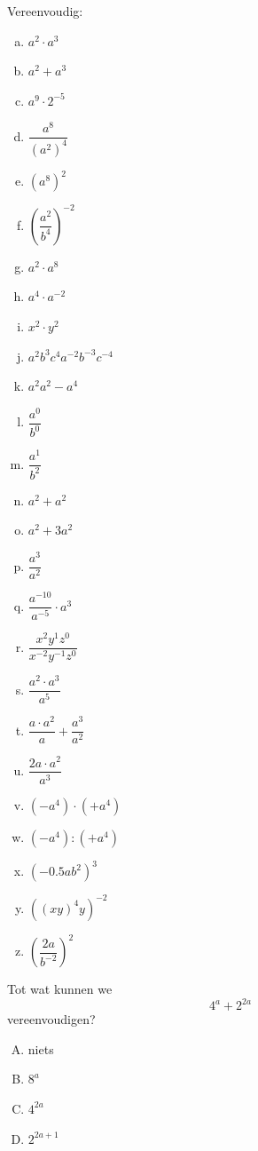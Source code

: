 \documentclass[12pt,twoside,a4paper]{article}
\begin{document}
\begin{oefening}
Vereenvoudig:
\begin{multicols}{3}
  \begin{enumerate}[(a)]
  \itemsep1em
  \item $a^2\cdot a^3$
  \item $a^2+a^3$
  \item $a^9\cdot2^{-5}$
  \item $\dfrac{a^8}{\left({a^2}\right)^4}$
  \item $\left(a^8\right)^2$
  \item $\left(\dfrac{a^2}{b^4}\right)^{-2}$
  \item $a^2\cdot a^8$
  \item $a^4\cdot a^{-2}$
  \item $x^2\cdot y^2$
  \item $a^2b^3c^4a^{-2}b^{-3}c^{-4}$
  \item $a^2a^2-a^4$
  \item $\dfrac{a^0}{b^0}$
  \item $\dfrac{a^1}{b^2}$
  \item $a^2+a^2$
  \item $a^2+3a^2$
  \item $\dfrac{a^3}{a^2}$
  \item $\dfrac{a^{-10}}{a^{-5}}\cdot{a^3}$
  \item $\dfrac{x^2y^1z^0}{x^{-2}y^{-1}z^{0}}$
  \item $\dfrac{a^2 \cdot a^3}{a^5}$
  \item $\dfrac{a \cdot a^2}{a} + \dfrac{a^3}{a^2}$
  \item $\dfrac{2a\cdot a^{2}}{a^{3}}$
  \item $\left(-a^4\right)\cdot\left(+a^4\right)$
  \item $\left(-a^4\right):\left(+a^4\right)$
  \item $\left(-0.5ab^2\right)^3$
  \item $\left(\left(xy\right)^4y\right)^{-2}$
  \item $\left(\dfrac{2a}{b^{-2}}\right)^2$
\end{enumerate}
\end{multicols}
\end{oefening}

\begin{oefening} %
  Tot wat kunnen we $$4^a+2^{2a}$$ vereenvoudigen?
  \begin{enumerate}[(A)]
  \item niets
  \item $8^a$
  \item $4^{2a}$
  \item $2^{2a+1}$ %
  \end{enumerate}
\end{oefening}
\end{document}

